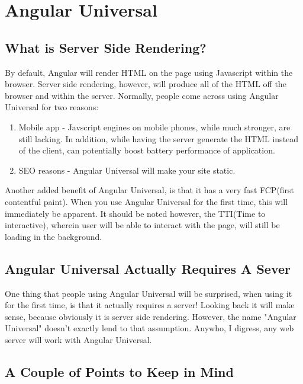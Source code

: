 \chapter{ Angular Universal }

\section{What is Server Side Rendering?}
\begin{quote}
\end{quote}

By default, Angular will render HTML on the page using Javascript within the browser. Server side rendering, however, will produce all of the HTML off the browser and within the server. Normally, people come across using Angular Universal for two reasons: 
\begin{enumerate}
  \item Mobile app - Javscript engines on mobile phones, while much stronger, are still lacking. In addition, while having the server generate the HTML instead of the client, can potentially boost battery performance of application.
  \item SEO reasons - Angular Universal will make your site static. 
\end{enumerate}

Another added benefit of Angular Universal, is that it has a very fast FCP(first contentful paint). When you use Angular Universal for the first time, this will immediately be apparent. It should be noted however, the TTI(Time to interactive), wherein user will be able to interact with the page, will still be loading in the background. 

\section{Angular Universal Actually Requires A Sever}
One thing that people using Angular Universal will be surprised, when using it for the first time, is that it actually requires a server! Looking back it will make sense, because obviously it is server side rendering. However, the name "Angular Universal" doesn't exactly lend to that assumption. Anywho, I digress, any web server will work with Angular Universal. 

\section{A Couple of Points to Keep in Mind}


